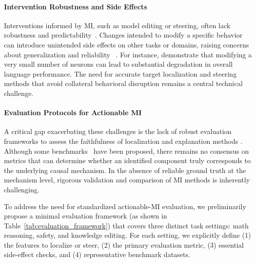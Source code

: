 \documentclass[11pt,letterpaper]{mystyle}
\begin{document}
\paragraph{Intervention Robustness and Side Effects} 
Interventions informed by MI, such as model editing or steering, often lack robustness and predictability~\citep{yin2024lofit,wang2025beyond}. Changes intended to modify a specific behavior can introduce unintended side effects on other tasks or domains, raising concerns about generalization and reliability ~\citep{jiang2024interpretable,zhang2024cofitune,zhang2025find,hsueh2024editing,xu2025easyedit2,da2025steering,braun2025beyond,zhang2025reinforcementfinetuningenablesmllms}. For instance, \citet{yuUnderstandingMitigatingGender2025a} demonstrate that modifying a very small number of neurons can lead to substantial degradation in overall language performance. The need for accurate target localization and steering methods that avoid collateral behavioral disruption remains a central technical challenge.



\paragraph{Evaluation Protocols for Actionable MI}
A critical gap exacerbating these challenges is the lack of robust evaluation frameworks to assess the faithfulness of localization and explanation methods \citep{miller2024transformer}. Although some benchmarks~\citep{mib2025,parrack2025benchmarking,nguyen1786probing,wu2025axbench,karvonen2025saebench} have been proposed, there remains no consensus on metrics that can determine whether an identified component truly corresponds to the underlying causal mechanism. In the absence of reliable ground truth at the mechanism level, rigorous validation and comparison of MI methods is inherently challenging. 

To address the need for standardized actionable-MI evaluation, we preliminarily propose a minimal evaluation framework (as shown in Table~\ref{tab:evaluation_framework}) that covers three distinct task settings: math reasoning, safety, and knowledge editing. For each setting, we explicitly define (1) the features to localize or steer, (2) the primary evaluation metric, (3) essential side-effect checks, and (4) representative benchmark datasets.
\end{document}
